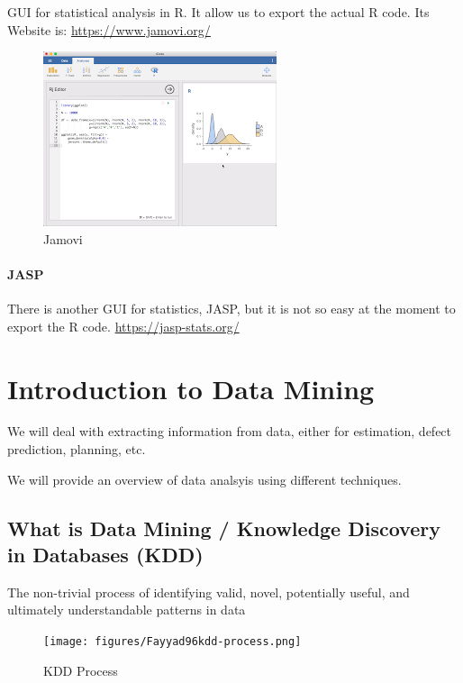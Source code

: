 \documentclass[
]{book}
\begin{document}
GUI for statistical analysis in R. It allow us to export the actual R code.
Its Website is: \url{https://www.jamovi.org/}

\begin{figure}
\centering
\includegraphics{./figures/jamovi.png}
\caption{Jamovi}
\end{figure}

\hypertarget{jasp}{%
\subsection{JASP}\label{jasp}}

There is another GUI for statistics, JASP, but it is not so easy at the moment to export the R code.
\url{https://jasp-stats.org/}

\hypertarget{part-introduction-to-data-mining}{%
\part{Introduction to Data Mining}\label{part-introduction-to-data-mining}}

We will deal with extracting information from data, either for estimation, defect prediction, planning, etc.

We will provide an overview of data analsyis using different techniques.

\hypertarget{what-is-data-mining-knowledge-discovery-in-databases-kdd}{%
\chapter{What is Data Mining / Knowledge Discovery in Databases (KDD)}\label{what-is-data-mining-knowledge-discovery-in-databases-kdd}}

The non-trivial process of identifying valid, novel, potentially useful, and ultimately understandable patterns in data \citep{FayyadPS1996}

\begin{figure}
\centering
\texttt{[image: figures/Fayyad96kdd-process.png]}
\caption{KDD Process}
\end{figure}
\end{document}
